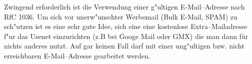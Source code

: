 Zwingend erforderlich ist die Verwendung einer g"ultigen E-Mail--Adresse nach
\glossar RfC 1036. Um sich vor unerw"unschter Werbemail (Bulk E-Mail, SPAM) zu
sch"utzen ist es eine sehr gute Idee, sich eine 
 eine kostenlose Extra--Mailadresse f"ur das Usenet einzurichten
    (z.B bei Googe Mail oder GMX) die man dann für nichts anderes
    nutzt.
Auf gar keinen Fall darf mit einer ung"ultigen bzw. nicht erreichbaren
E-Mail--Adresse gearbeitet werden.


